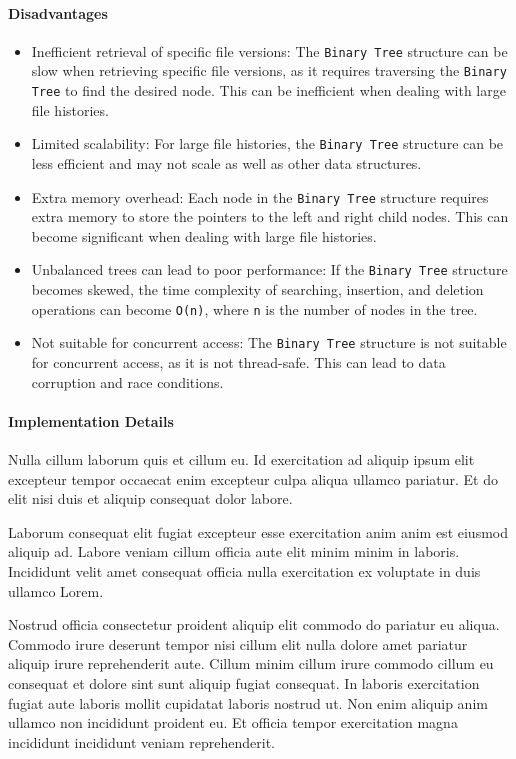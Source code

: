 \paragraph{Disadvantages}
\begin{itemize}
    \item Inefficient retrieval of specific file versions: The \lstinline{Binary Tree} structure can be slow when retrieving specific file versions, as it requires traversing the \lstinline{Binary Tree} to find the desired node. This can be inefficient when dealing with large file histories.
    \item Limited scalability: For large file histories, the \lstinline{Binary Tree} structure can be less efficient and may not scale as well as other data structures.
    \item Extra memory overhead: Each node in the \lstinline{Binary Tree} structure requires extra memory to store the pointers to the left and right child nodes. This can become significant when dealing with large file histories.
    \item Unbalanced trees can lead to poor performance: If the \lstinline{Binary Tree} structure becomes skewed, the time complexity of searching, insertion, and deletion operations can become \lstinline{O(n)}, where \lstinline{n} is the number of nodes in the tree.
    \item Not suitable for concurrent access: The \lstinline{Binary Tree} structure is not suitable for concurrent access, as it is not thread-safe. This can lead to data corruption and race conditions.
\end{itemize}

\paragraph{Implementation Details}
Nulla cillum laborum quis et cillum eu. Id exercitation ad aliquip ipsum elit excepteur tempor occaecat enim excepteur culpa aliqua ullamco pariatur. Et do elit nisi duis et aliquip consequat dolor labore.

Laborum consequat elit fugiat excepteur esse exercitation anim anim est eiusmod aliquip ad. Labore veniam cillum officia aute elit minim minim in laboris. Incididunt velit amet consequat officia nulla exercitation ex voluptate in duis ullamco Lorem.

Nostrud officia consectetur proident aliquip elit commodo do pariatur eu aliqua. Commodo irure deserunt tempor nisi cillum elit nulla dolore amet pariatur aliquip irure reprehenderit aute. Cillum minim cillum irure commodo cillum eu consequat et dolore sint sunt aliquip fugiat consequat. In laboris exercitation fugiat aute laboris mollit cupidatat laboris nostrud ut. Non enim aliquip anim ullamco non incididunt proident eu. Et officia tempor exercitation magna incididunt incididunt veniam reprehenderit.

